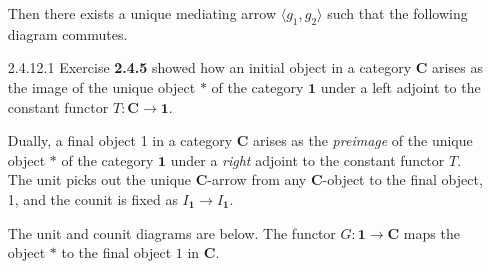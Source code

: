 \documentclass{article}
\newcommand{\one}{\mathbf{1}}
\newcommand{\ccat}{\mathbf{C}}
\begin{document}
\begin{enumerate}
  Then there exists a unique mediating arrow $\langle g_1 , g_2 \rangle$ such that the following diagram commutes.
  \begin{center}
  \end{center}


\newpage
\item[2.4.12.1] %
  Exercise \textbf{2.4.5} showed how an initial object in a category $\ccat$ arises as the image of the unique object $*$ of the category $\one$ under a left adjoint to the constant functor $T : \ccat \rightarrow \one$.

  Dually, a final object 1 in a category $\ccat$ arises as the \emph{preimage} of the unique object $*$ of the category $\one$ under a \emph{right} adjoint to the constant functor $T$.
  The unit picks out the unique $\ccat$-arrow from any $\ccat$-object to the final object, 1, and the counit is fixed as $I_\one \rightarrow I_\one$.

  The unit and counit diagrams are below.
  The functor $G : \one \rightarrow \ccat$ maps the object $*$ to the final object $1$ in $\ccat$.
  \begin{center}
      \hspace{2cm}
  \end{center}


\end{enumerate}
\end{document}

